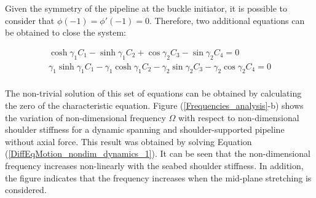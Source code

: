 \documentclass[3p,doublespacing,authoryear,11pt]{elsarticle} %
\begin{document}
Given the symmetry of the pipeline at the buckle initiator, it is possible to consider that $ \phi (-1) = \phi' (-1) =0$. Therefore, two additional equations can be obtained to close the system:

\begin{equation}\label{BoundaryConditions}
 \begin{array}{l }   
\displaystyle    \cosh \gamma_1 C_1 - \sinh \gamma_1 C_2 + \cos \gamma_2C_3   -  \sin \gamma_2 C_4= 0 \\
\displaystyle   \gamma_1 \sinh \gamma_1 C_1 - \gamma_1 \cosh \gamma_1 C_2 -  \gamma_2 \sin  \gamma_2C_3   -   \gamma_2 \cos \gamma_2 C_4 = 0 \\
  \end{array}  
\end{equation} 

The non-trivial solution of this set of equations can be obtained by calculating the zero of the characteristic equation. Figure (\ref{Frequencies_analysis}-b) shows the variation of non-dimensional frequency $\Omega$ with respect to non-dimensional shoulder stiffness for a dynamic spanning and shoulder-supported pipeline without axial force. This result was obtained by solving Equation (\ref{DiffEqMotion_nondim_dynamics_1}). It can be seen that the non-dimensional frequency increases non-linearly with the seabed shoulder stiffness. In addition, the figure indicates that the frequency increases when the mid-plane stretching is considered. 
\end{document}
